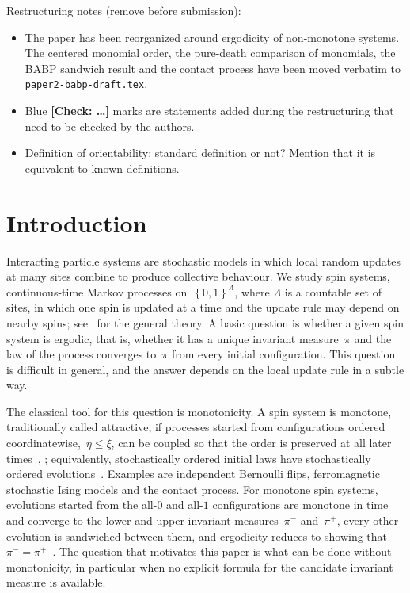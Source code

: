 \documentclass[EJP,preprint,NODS,nobera]{ejpecp}
\newcommand{\cb}[1]{\left\{#1\right\}}
\begin{document}
\setcounter{tocdepth}{1}
\tableofcontents

{\color{red} Restructuring notes (remove before submission):
  \begin{itemize}
  \item The paper has been reorganized around ergodicity of non-monotone
    systems. The centered monomial order, the pure-death comparison of
    monomials, the BABP sandwich result and the contact process have been
    moved verbatim to \texttt{paper2-babp-draft.tex}.
  \item Blue \textbf{[Check: \dots]} marks are statements added during the
    restructuring that need to be checked by the authors.
  \item Definition of orientability: standard definition or not? Mention
    that it is equivalent to known definitions.
  \end{itemize}
}

\section{Introduction}
\label{sec:introduction}

Interacting particle systems are stochastic models in which local random
updates at many sites combine to produce collective behaviour. We study spin
systems, continuous-time Markov processes on~$\cb{0,1}^{\Lambda}$, where
$\Lambda$ is a countable set of sites, in which one spin is updated at a time
and the update rule may depend on nearby spins; see~\cite{Liggett1985} for the
general theory. A basic question is whether a given spin system is ergodic,
that is, whether it has a unique invariant measure~$\pi$ and the law of the
process converges to~$\pi$ from every initial configuration. This question is
difficult in general, and the answer depends on the local update rule in a
subtle way.

The classical tool for this question is monotonicity. A spin system is
monotone, traditionally called attractive, if processes started from
configurations ordered coordinatewise,~$\eta\leq\xi$, can be coupled so that
the order is preserved at all later times~\cite{Harris1977},
\cite[Chapter~III, Theorem~2.2]{Liggett1985}; equivalently, stochastically
ordered initial laws have stochastically ordered
evolutions~\cite[Chapter~II, Theorem~2.2 and Definition~2.3]{Liggett1985}.
Examples are independent Bernoulli flips, ferromagnetic stochastic Ising
models and the contact process. For monotone spin systems, evolutions started
from the all-$0$ and all-$1$ configurations are monotone in time and converge
to the lower and upper invariant measures~$\pi^-$ and~$\pi^+$, every other
evolution is sandwiched between them, and ergodicity reduces to showing
that~$\pi^-=\pi^+$~\cite[Chapter~III, Theorem~2.3 and
Corollary~2.4]{Liggett1985}. The question that motivates this paper is what
can be done without monotonicity, in particular when no explicit formula for
the candidate invariant measure is available.
\end{document}
